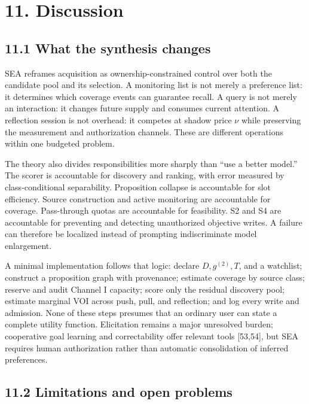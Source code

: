 \documentclass[
  11pt]{article}
\begin{document}
\section{11. Discussion}\label{discussion}

\subsection{11.1 What the synthesis changes}\label{what-the-synthesis-changes}

SEA reframes acquisition as ownership-constrained control over both the candidate pool and its selection. A monitoring list is not merely a preference list: it determines which coverage events can guarantee recall. A query is not merely an interaction: it changes future supply and consumes current attention. A reflection session is not overhead: it competes at shadow price \(\nu\) while preserving the measurement and authorization channels. These are different operations within one budgeted problem.

The theory also divides responsibilities more sharply than ``use a better model.'' The scorer is accountable for discovery and ranking, with error measured by class-conditional separability. Proposition collapse is accountable for slot efficiency. Source construction and active monitoring are accountable for coverage. Pass-through quotas are accountable for feasibility. S2 and S4 are accountable for preventing and detecting unauthorized objective writes. A failure can therefore be localized instead of prompting indiscriminate model enlargement.

A minimal implementation follows that logic: declare \(D,g^{(2)},T\), and a watchlist; construct a proposition graph with provenance; estimate coverage by source class; reserve and audit Channel I capacity; score only the residual discovery pool; estimate marginal VOI across push, pull, and reflection; and log every write and admission. None of these steps presumes that an ordinary user can state a complete utility function. Elicitation remains a major unresolved burden; cooperative goal learning and correctability offer relevant tools {[}53,54{]}, but SEA requires human authorization rather than automatic consolidation of inferred preferences.

\subsection{11.2 Limitations and open problems}\label{limitations-and-open-problems}
\end{document}
